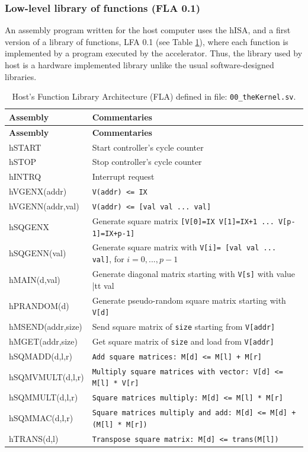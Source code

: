 \subsubsection{Low-level library of functions (FLA 0.1)}

An assembly program written for the host computer uses the hISA, and a first version of a  library of functions, LFA 0.1 (see Table \ref{tab:lfa01}), where each function is implemented by a program executed by the accelerator. Thus, the library used by host is a hardware implemented library unlike the usual software-designed libraries.

{\small
{\centering
\begin{longtable}{|l|l|}
\caption{Host's Function Library Architecture (FLA) defined in file: {\tt 00\_theKernel.sv}.}
\label{tab:lfa01} \\
\hline
\textbf{Assembly} & \textbf{Commentaries} \\
\hline
\endfirsthead
\hline
\textbf{Assembly} & \textbf{Commentaries} \\
\hline
\endhead
\hline
\endfoot
\hline
\endlastfoot
hSTART           & Start controller's cycle counter \\ \hline
hSTOP            & Stop controller's cycle counter \\ \hline
hINTRQ           & Interrupt request \\ \hline
hVGENX(addr)     & \texttt{V(addr) <= IX} \\ \hline
hVGENN(addr,val) & \texttt{V(addr) <= [val val ... val]} \\ \hline
hSQGENX          & Generate square matrix \texttt{[V[0]=IX V[1]=IX+1 ... V[p-1]=IX+p-1]} \\ \hline
hSQGENN(val)     & Generate square matrix with \texttt{V[i]= [val val ... val]}, for \(i = 0, ..., p-1\) \\ \hline
hMAIN(d,val)      & Generate diagonal matrix starting with \texttt{V[s]} with value {|tt val}  \\ \hline
hPRANDOM(d)      & Generate pseudo-random square matrix starting with \texttt{V[d]} \\ \hline
hMSEND(addr,size)& Send square matrix of \texttt{size} starting from \texttt{V[addr]} \\ \hline
hMGET(addr,size) & Get square matrix of \texttt{size} and load from \texttt{V[addr]} \\ \hline
hSQMADD(d,l,r)   & \texttt{Add square matrices: M[d] <= M[l] + M[r]} \\ \hline
hSQMVMULT(d,l,r) & \texttt{Multiply square matrices with vector: V[d] <= M[l] * V[r]} \\ \hline
hSQMMULT(d,l,r)  & \texttt{Square matrices multiply: M[d] <= M[l] * M[r]} \\ \hline
hSQMMAC(d,l,r)   & \texttt{Square matrices multiply and add: M[d] <= M[d] + (M[l] * M[r])} \\ \hline
hTRANS(d,l)   & \texttt{Transpose square matrix: M[d] <= trans(M[l])} \\ \hline
\end{longtable}
}
}
